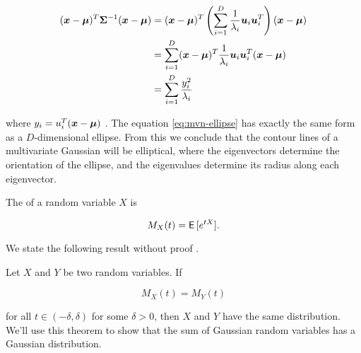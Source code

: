\begin{tcolorbox}
    \begin{align}
    ({\bm{x}} - {\bm{\mu}})^T {\bm{\Sigma}}^{-1} ({\bm{x}} - {\bm{\mu}}) &= ({\bm{x}} - {\bm{\mu}})^T \left( \sum_{i = 1}^D \frac{1}{\lambda_i} {\bm{u}}_i {\bm{u}}_i^T \right) ({\bm{x}} - {\bm{\mu}}) \\
    &= \sum_{i = 1}^D ({\bm{x}} - {\bm{\mu}})^T \frac{1}{\lambda_i} {\bm{u}}_i {\bm{u}}_i^T ({\bm{x}} - {\bm{\mu}}) \\
    &= \sum_{i = 1}^D \frac{y_i^2}{\lambda_i} \label{eq:mvn-ellipse}
    \end{align}
    
    where $y_i = u_{i}^{T} ({\bm{x}} - {\bm{\mu}})$ . The equation \eqref{eq:mvn-ellipse} has exactly the same form as a $D$-dimensional ellipse. From this we conclude that the contour lines of a multivariate Gaussian will be elliptical, where the eigenvectors determine the orientation of the ellipse, and the eigenvalues determine its radius  along each eigenvector.
    
\end{tcolorbox}

\begin{defn}
    The  of a random variable $X$ is
    
    \begin{equation}
    M_X(t) = \operatorname{\textsf{E}\,}[e^{t X}].
    \end{equation}
\end{defn}

We state the following result without proof .

\begin{thm}
    Let $X$ and $Y$ be two random variables. If
    
    \begin{equation}
    M_X(t) = M_Y(t)
    \end{equation}
    
    for all $t \in (-\delta, \delta)$ for some $\delta > 0$, then $X$ and $Y$ have the same distribution. We'll use this theorem to show that the sum of Gaussian random variables has a Gaussian distribution.
\end{thm}

